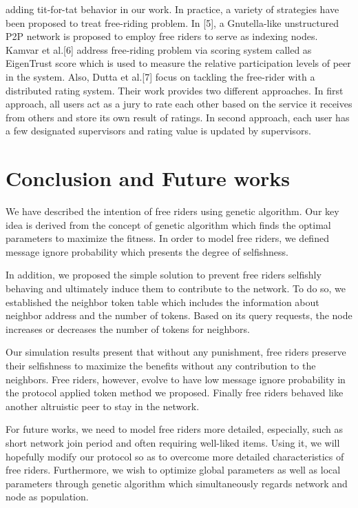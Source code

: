 \documentclass[12pt,journal,draftcls,letterpaper,onecolumn]{IEEEtran}
\begin{document}
adding tit-for-tat behavior in our work.
In practice, a variety of strategies have been proposed to treat free-riding problem. In [5], a
Gnutella-like unstructured P2P network is proposed to employ free riders to serve as indexing
nodes. Kamvar et al.[6] address free-riding problem via scoring system called as EigenTrust
score which is used to measure the relative participation levels of peer in the system. Also,
Dutta et al.[7] focus on tackling the free-rider with a distributed rating system. Their work
provides two different approaches. In first approach, all users act as a jury to rate each other
based on the service it receives from others and store its own result of ratings. In second
approach, each user has a few designated supervisors and rating value is updated by
supervisors.


\section{Conclusion and Future works}\label{sec:concl}

We have described the intention of free riders using genetic algorithm. Our key idea is
derived from the concept of genetic algorithm which finds the optimal parameters to
maximize the fitness. In order to model free riders, we defined message ignore probability
which presents the degree of selfishness.

In addition, we proposed the simple solution to prevent free riders selfishly behaving and
ultimately induce them to contribute to the network. To do so, we established the neighbor
token table which includes the information about neighbor address and the number of tokens.
Based on its query requests, the node increases or decreases the number of tokens for
neighbors.

Our simulation results present that without any punishment, free riders preserve their
selfishness to maximize the benefits without any contribution to the neighbors. Free riders,
however, evolve to have low message ignore probability in the protocol applied token method
we proposed. Finally free riders behaved like another altruistic peer to stay in the network.

For future works, we need to model free riders more detailed, especially, such as short
network join period and often requiring well-liked items. Using it, we will hopefully modify
our protocol so as to overcome more detailed characteristics of free riders. Furthermore, we
wish to optimize global parameters as well as local parameters through genetic algorithm
which simultaneously regards network and node as population.



\end{document}
